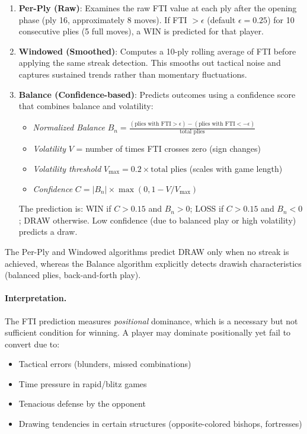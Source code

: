 \documentclass[11pt]{book}
\begin{document}
\begin{enumerate}
\item \textbf{Per-Ply (Raw)}: Examines the raw FTI value at each ply after the opening phase (ply 16, approximately 8 moves). If FTI $> \epsilon$ (default $\epsilon = 0.25$) for 10 consecutive plies (5 full moves), a WIN is predicted for that player.

\item \textbf{Windowed (Smoothed)}: Computes a 10-ply rolling average of FTI before applying the same streak detection. This smooths out tactical noise and captures sustained trends rather than momentary fluctuations.

\item \textbf{Balance (Confidence-based)}: Predicts outcomes using a confidence score that combines balance and volatility:
\begin{itemize}
\item \emph{Normalized Balance} $B_n = \frac{(\text{plies with FTI} > \epsilon) - (\text{plies with FTI} < -\epsilon)}{\text{total plies}}$
\item \emph{Volatility} $V$ = number of times FTI crosses zero (sign changes)
\item \emph{Volatility threshold} $V_{\max} = 0.2 \times \text{total plies}$ (scales with game length)
\item \emph{Confidence} $C = |B_n| \times \max(0, 1 - V/V_{\max})$
\end{itemize}
The prediction is: WIN if $C > 0.15$ and $B_n > 0$; LOSS if $C > 0.15$ and $B_n < 0$; DRAW otherwise. Low confidence (due to balanced play or high volatility) predicts a draw.
\end{enumerate}

The Per-Ply and Windowed algorithms predict DRAW only when no streak is achieved, whereas the Balance algorithm explicitly detects drawish characteristics (balanced plies, back-and-forth play).

\paragraph{Interpretation.} The FTI prediction measures \emph{positional} dominance, which is a necessary but not sufficient condition for winning. A player may dominate positionally yet fail to convert due to:
\begin{itemize}
\item Tactical errors (blunders, missed combinations)
\item Time pressure in rapid/blitz games
\item Tenacious defense by the opponent
\item Drawing tendencies in certain structures (opposite-colored bishops, fortresses)
\end{itemize}
\end{document}
